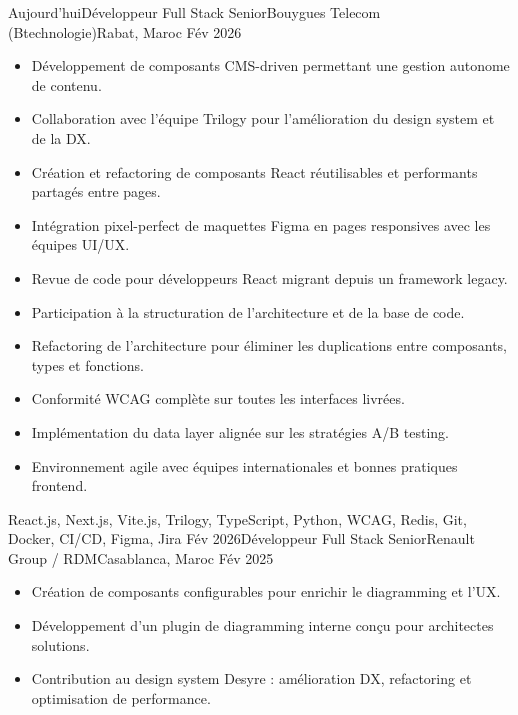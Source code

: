 \begin{experiences}
    \experience
        {Aujourd'hui}{Développeur Full Stack Senior}{Bouygues Telecom (Btechnologie)}{Rabat, Maroc}
        {Fév 2026}
            {\begin{itemize}
                \item Développement de composants CMS-driven permettant une gestion autonome de contenu.
                \item Collaboration avec l'équipe Trilogy pour l'amélioration du design system et de la DX.
                \item Création et refactoring de composants React réutilisables et performants partagés entre pages.
                \item Intégration pixel-perfect de maquettes Figma en pages responsives avec les équipes UI/UX.
                \item Revue de code pour développeurs React migrant depuis un framework legacy.
                \item Participation à la structuration de l'architecture et de la base de code.
                \item Refactoring de l'architecture pour éliminer les duplications entre composants, types et fonctions.
                \item Conformité WCAG complète sur toutes les interfaces livrées.
                \item Implémentation du data layer alignée sur les stratégies A/B testing.
                \item Environnement agile avec équipes internationales et bonnes pratiques frontend.
            \end{itemize}}
            {React.js, Next.js, Vite.js, Trilogy, TypeScript, Python, WCAG, Redis, Git, Docker, CI/CD, Figma, Jira}
    \emptySeparator
    \experience
        {Fév 2026}{Développeur Full Stack Senior}{Renault Group / RDM}{Casablanca, Maroc}
        {Fév 2025}
            {\begin{itemize}
                \item Création de composants configurables pour enrichir le diagramming et l'UX.
                \item Développement d'un plugin de diagramming interne conçu pour architectes solutions.
                \item Contribution au design system Desyre : amélioration DX, refactoring et optimisation de performance.

\end{itemize}}
\end{experiences}
